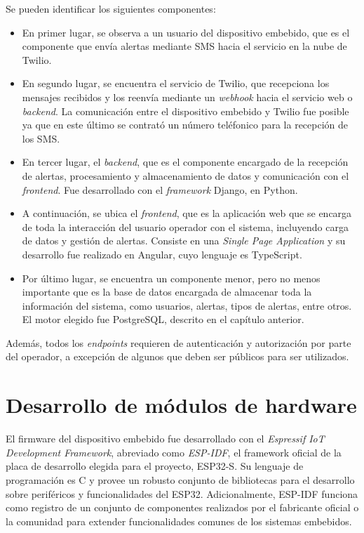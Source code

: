 Se pueden identificar los siguientes componentes:
\begin{itemize}
	\item En primer lugar, se observa a un usuario del dispositivo embebido, que es el componente que envía alertas mediante SMS hacia el servicio en la nube de Twilio.
	\item En segundo lugar, se encuentra el servicio de Twilio, que recepciona los mensajes recibidos y los reenvía mediante un \textit{webhook} hacia el servicio web o \textit{backend}. La comunicación entre el dispositivo embebido y Twilio fue posible ya que en este último se contrató un número teléfonico para la recepción de los SMS. 
	\item En tercer lugar, el \textit{backend}, que es el componente encargado de la recepción de alertas, procesamiento y almacenamiento de datos y comunicación con el \textit{frontend}. Fue desarrollado con el \textit{framework} Django, en Python.
	\item A continuación, se ubica el \textit{frontend}, que es la aplicación web que se encarga de toda la interacción del usuario operador con el sistema, incluyendo carga de datos y gestión de alertas. Consiste en una \textit{Single Page Application } y su desarrollo fue realizado en Angular, cuyo lenguaje es TypeScript\citep{ANGULAR:1}.
	\item Por último lugar, se encuentra un componente menor, pero no menos importante que es la base de datos encargada de almacenar toda la información del sistema, como usuarios, alertas, tipos de alertas, entre otros. El motor elegido fue PostgreSQL, descrito en el capítulo anterior.
\end{itemize}

Además, todos los \textit{endpoints} requieren de autenticación y autorización por parte del operador, a excepción de algunos que deben ser públicos para ser utilizados.
   
\section{Desarrollo de módulos de hardware}

El firmware del dispositivo embebido fue desarrollado con el \textit{Espressif IoT Development Framework}, abreviado como \textit{ESP-IDF}, el framework oficial de la placa de desarrollo elegida para el proyecto, ESP32-S\citep{ESPIDF:1}. Su lenguaje de programación es C y provee un robusto conjunto de bibliotecas para el desarrollo sobre periféricos y funcionalidades del ESP32. Adicionalmente, ESP-IDF funciona como registro de un conjunto de componentes realizados por el fabricante oficial o la comunidad para extender funcionalidades comunes de los sistemas embebidos. 

